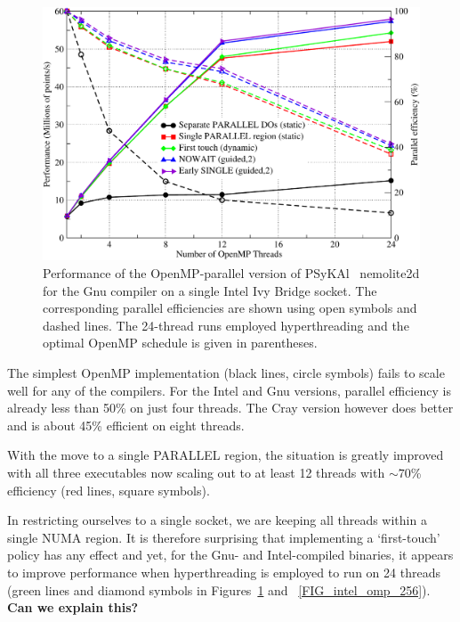 \documentclass[journal]{IEEEtran}
\newlength{\picwidth}
\newcommand{\psykal}{{PS}y{KA}l\ }
\begin{document}
\begin{figure}
\centering
\includegraphics[width=\picwidth]{omp_scaling_256_gnu}
\caption{Performance of the OpenMP-parallel version of \psykal
  nemolite2d for the Gnu compiler on a single Intel Ivy Bridge
  socket. The corresponding parallel efficiencies are shown using open
  symbols and dashed lines. The 24-thread runs employed hyperthreading
  and the optimal OpenMP schedule is given in parentheses.}
\label{FIG_gnu_omp_256}
\end{figure}

The simplest OpenMP implementation (black lines, circle symbols) fails
to scale well for any of the compilers. For the Intel and Gnu
versions, parallel efficiency is already less than 50\% on just four
threads. The Cray version however does better and is about 45\%
efficient on eight threads.

With the move to a single PARALLEL region, the situation
is greatly improved with all three executables now scaling out to at
least 12 threads with $\sim70$\% efficiency (red lines, square symbols).

In restricting ourselves to a single socket, we are keeping all
threads within a single NUMA region. It is therefore surprising that
implementing a `first-touch' policy has any effect and yet, for the
Gnu- and Intel-compiled binaries, it appears to improve performance
when hyperthreading is employed to run on 24 threads (green lines and
diamond symbols in Figures~\ref{FIG_gnu_omp_256} and
~\ref{FIG_intel_omp_256}). {\bf Can we explain this?}
\end{document}
